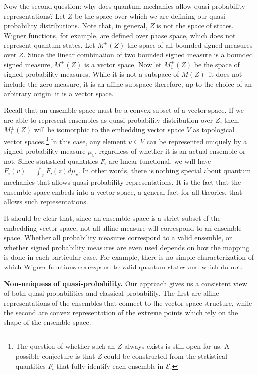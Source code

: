 \documentclass[10pt,twocolumn, nofootinbib]{revtex4-2}
\newcommand{\Ens}[1][E] {\mathcal{#1}} %
\begin{document}
Now the second question: why does quantum mechanics allow quasi-probability representations? Let $Z$ be the space over which we are defining our quasi-probability distributions. Note that, in general, $Z$ is not the space of states. Wigner functions, for example, are defined over phase space, which does not represent quantum states. Let $M^{\pm}(Z)$ the space of all bounded signed measures over $Z$. Since the linear combination of two bounded signed measure is a bounded signed measure, $M^{\pm}(Z)$ is a vector space. Now let $M_1^{\pm}(Z)$ be the space of signed probability measures. While it is not a subspace of $M(Z)$, it does not include the zero measure, it is an affine subspace therefore, up to the choice of an arbitrary origin, it is a vector space.

Recall that an ensemble space must be a convex subset of a vector space. If we are able to represent ensembles as quasi-probability distribution over $Z$, then, $M_1^{\pm}(Z)$ will be isomorphic to the embedding vector space $V$ as topological vector spaces.\footnote{The question of whether such an $Z$ always exists is still open for us. A possible conjecture is that $Z$ could be constructed from the statistical quantities $F_i$ that fully identify each ensemble in $\Ens$.} In this case, any element $v\in V$ can be represented uniquely by a signed probability measure $\mu_{v}$, regardless of whether it is an actual ensemble or not. Since statistical quantities $F_i$ are linear functional, we will have $F_i(v) = \int_Z F_i(z) d\mu_{v}$. In other words, there is nothing special about quantum mechanics that allows quasi-probability representations. It is the fact that the ensemble space embeds into a vector space, a general fact for all theories, that allows such representations.

It should be clear that, since an ensemble space is a strict subset of the embedding vector space, not all affine measure will correspond to an ensemble space. Whether all probability measures correspond to a valid ensemble, or whether signed probability measures are even used depends on how the mapping is done in each particular case. For example, there is no simple characterization of which Wigner functions correspond to valid quantum states and which do not.


\textbf{Non-uniquess of quasi-probability.} Our approach gives us a consistent view of both quasi-probabilities and classical probability. The first are affine representations of the ensembles that connect to the vector space structure, while the second are convex representation of the extreme points which rely on the shape of the ensemble space.
\end{document}
